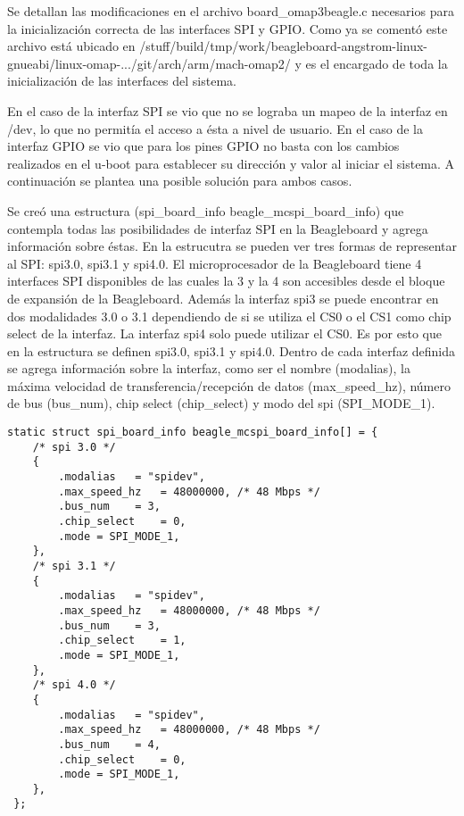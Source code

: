 Se detallan las modificaciones en el archivo board\_omap3beagle.c necesarios para la inicialización correcta de las interfaces SPI y GPIO. Como ya se comentó este archivo está ubicado en /stuff/build/tmp/work/beagleboard-angstrom-linux-gnueabi/linux-omap-.../git/arch/arm/mach-omap2/ y es el encargado de toda la inicialización de las interfaces del sistema.

\bigskip
En el caso de la interfaz SPI se vio que no se lograba un mapeo de la interfaz en /dev, lo que no permitía el acceso a ésta a nivel de usuario. En el caso de la interfaz GPIO se vio que para los pines GPIO no basta con los cambios realizados en el u-boot para establecer su dirección y valor al iniciar el sistema.
A continuación se plantea una posible solución para ambos casos.

\bigskip
{}

\bigskip
Se creó una estructura (spi\_board\_info beagle\_mcspi\_board\_info) que contempla todas las posibilidades de interfaz SPI en la Beagleboard y agrega información sobre éstas.
En la estrucutra se pueden ver tres formas de representar al SPI: spi3.0, spi3.1 y spi4.0. El microprocesador de la Beagleboard tiene 4 interfaces SPI disponibles de las cuales la 3 y la 4 son accesibles desde el bloque de expansión de la Beagleboard. Además la interfaz spi3 se puede encontrar en dos modalidades 3.0 o 3.1 dependiendo de si se utiliza el CS0 o el CS1 como chip select de la interfaz. La interfaz spi4 solo puede utilizar el CS0.
Es por esto que en la estructura se definen spi3.0, spi3.1 y spi4.0.
Dentro de cada interfaz definida se agrega información sobre la interfaz, como ser el nombre (modalias), la máxima velocidad de transferencia/recepción de datos (max\_speed\_hz), número de bus (bus\_num), chip select (chip\_select) y modo del spi (SPI\_MODE\_1).

\begin{verbatim}
static struct spi_board_info beagle_mcspi_board_info[] = { 
    /* spi 3.0 */ 
    { 
        .modalias	= "spidev", 
        .max_speed_hz	= 48000000, /* 48 Mbps */ 
        .bus_num	= 3, 
        .chip_select	= 0,	 
        .mode = SPI_MODE_1, 
    }, 
    /* spi 3.1 */ 
    { 
        .modalias	= "spidev", 
        .max_speed_hz	= 48000000, /* 48 Mbps */ 
        .bus_num	= 3, 
        .chip_select	= 1,	 
        .mode = SPI_MODE_1, 
    }, 
    /* spi 4.0 */ 
    { 
        .modalias	= "spidev", 
        .max_speed_hz	= 48000000, /* 48 Mbps */ 
        .bus_num	= 4, 
        .chip_select	= 0,	 
        .mode = SPI_MODE_1, 
    }, 
 }; 
\end{verbatim}

